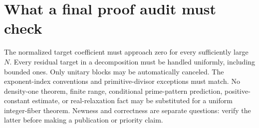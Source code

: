 \section{What a final proof audit must check}
The normalized target coefficient must approach zero for every sufficiently
large $N$. Every residual target in a decomposition must be handled uniformly,
including bounded ones. Only unitary blocks may be automatically canceled.
The exponent-index conventions and primitive-divisor exceptions must match.
No density-one theorem, finite range, conditional prime-pattern prediction,
positive-constant estimate, or real-relaxation fact may be substituted for a
uniform integer-fiber theorem. Newness and correctness are separate questions:
verify the latter before making a publication or priority claim.
